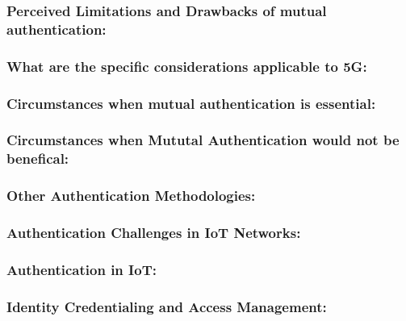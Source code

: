 \documentclass[lnicst,sechang,a4paper]{svmultln}
\begin{document}
\subsubsection{Perceived Limitations and Drawbacks of mutual authentication:}
\subsubsection{What are the specific considerations applicable to 5G:}
\subsubsection{Circumstances when mutual authentication is essential:}
\subsubsection{Circumstances when Mututal Authentication would not be benefical:}
\subsubsection{Other Authentication Methodologies:}
\subsubsection{Authentication Challenges in IoT Networks:}
\subsubsection{Authentication in IoT:}
\subsubsection{Identity Credentialing and Access Management:}

\begin{thebibliography}{4}






\end{thebibliography}
\end{document}
